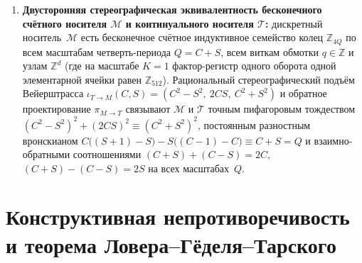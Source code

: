 \begin{enumerate}[label=\textbf{\arabic*.},leftmargin=*]
\begin{equation}
    \label{eq:mono-bracket-squeeze}
    L_w \le X \le U_w \;\land\; U_w - L_w = 0 \quad\Longrightarrow\quad L_w \;=\; X \;=\; U_w.
  \end{equation}
\item \textbf{Двусторонняя стереографическая эквивалентность бесконечного счётного носителя $\mathcal{M}$ и континуального носителя $\mathcal{T}$:}
  дискретный носитель~$\mathcal{M}$ есть бесконечное счётное индуктивное семейство колец $\mathbb{Z}_{4Q}$ по всем масштабам четверть-периода $Q = C + S$, всем виткам обмотки $q\in\mathbb{Z}$ и узлам $\mathbb{Z}^d$ (где на масштабе $K=1$ фактор-регистр одного оборота одной элементарной ячейки равен $\mathbb{Z}_{512}$). Рациональный стереографический подъём Вейерштрасса $\iota_{T\to M}(C,S) = (C^2-S^2,\ 2CS,\ C^2+S^2)$ и обратное проектирование $\pi_{M\to T}$ связывают $\mathcal{M}$ и $\mathcal{T}$ точным пифагоровым тождеством $(C^2-S^2)^2 + (2CS)^2 \equiv (C^2+S^2)^2$, постоянным разностным вронскианом $C\bigl((S+1)-S\bigr) - S\bigl((C-1)-C\bigr) \equiv C + S = Q$ и взаимно-обратными соотношениями $(C+S) + (C-S) = 2C$, $(C+S) - (C-S) = 2S$ на всех масштабах~$Q$.
\end{enumerate}

\section{Конструктивная непротиворечивость и теорема Ловера--Гёделя--Тарского}

